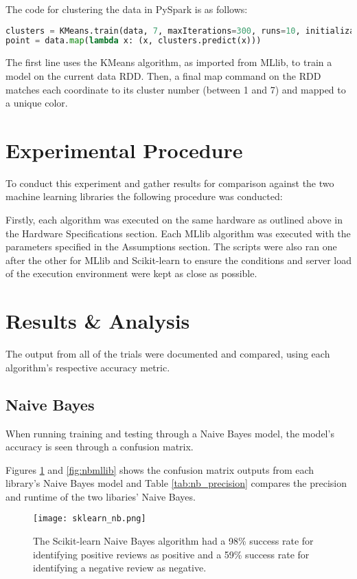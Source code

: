 \documentclass[9pt,twocolumn,twoside]{idsi}
\begin{document}
The code for clustering the data in PySpark is as follows:
\begin{lstlisting}[language=Python, breaklines=true]
clusters = KMeans.train(data, 7, maxIterations=300, runs=10, initializationMode="k-means")
point = data.map(lambda x: (x, clusters.predict(x)))
\end{lstlisting}

The first line uses the KMeans algorithm, as imported from MLlib, to train a model on the current data RDD. Then, a final map command on the RDD matches each coordinate to its cluster number (between 1 and 7) and mapped to a unique color. 

\section{Experimental Procedure}
To conduct this experiment and gather results for comparison against the two machine learning libraries the following procedure was conducted:

Firstly, each algorithm was executed on the same hardware as outlined above in the Hardware Specifications section. Each MLlib algorithm was executed with the parameters specified in the Assumptions section. The scripts were also ran one after the other for MLlib and Scikit-learn to ensure the conditions and server load of the execution environment were kept as close as possible. 

\section{Results \& Analysis}
The output from all of the trials were documented and compared, using each algorithm's respective accuracy metric.
\subsection{Naive Bayes}
When running training and testing through a Naive Bayes model, the model's accuracy is seen through a confusion matrix.

Figures \ref{fig:nbsklearn}  and \ref{fig:nbmllib} shows the confusion matrix outputs from each library's Naive Bayes model and Table  \ref{tab:nb_precision} compares the precision and runtime of the two libaries' Naive Bayes.

\begin{figure}[htbp]
\centering
\texttt{[image: sklearn\_nb.png]}
\caption{The Scikit-learn Naive Bayes algorithm had a 98\% success rate for identifying positive reviews as positive and a 59\% success rate for identifying a negative review as negative.}
\label{fig:nbsklearn}
\end{figure}
\end{document}
